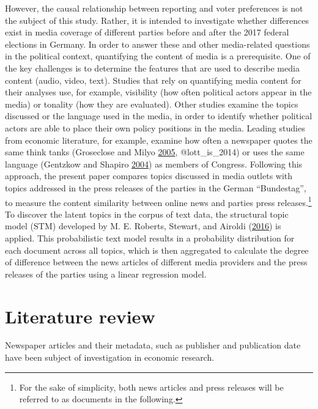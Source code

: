 \documentclass[
]{article}
\begin{document}
However, the causal relationship between reporting and voter preferences
is not the subject of this study. Rather, it is intended to investigate
whether differences exist in media coverage of different parties before
and after the 2017 federal elections in Germany. In order to answer
these and other media-related questions in the political context,
quantifying the content of media is a prerequisite. One of the key
challenges is to determine the features that are used to describe media
content (audio, video, text). Studies that rely on quantifying media
content for their analyses use, for example, visibility (how often
political actors appear in the media) or tonality (how they are
evaluated). Other studies examine the topics discussed or the language
used in the media, in order to identify whether political actors are
able to place their own policy positions in the media. Leading studies
from economic literature, for example, examine how often a newspaper
quotes the same think tanks (Groseclose and Milyo
\protect\hyperlink{ref-groseclose_measure_2005}{2005}, @lott\_is\_2014)
or uses the same language (Gentzkow and Shapiro
\protect\hyperlink{ref-gentzkow_media_2004}{2004}) as members of
Congress. Following this approach, the present paper compares topics
discussed in media outlets with topics addressed in the press releases
of the parties in the German ``Bundestag'', to measure the content
similarity between online news and parties press releases.\footnote{For
  the sake of simplicity, both news articles and press releases will be
  referred to as documents in the following.} To discover the latent
topics in the corpus of text data, the structural topic model (STM)
developed by M. E. Roberts, Stewart, and Airoldi
(\protect\hyperlink{ref-roberts_model_2016}{2016}) is applied. This
probabilistic text model results in a probability distribution for each
document across all topics, which is then aggregated to calculate the
degree of difference between the news articles of different media
providers and the press releases of the parties using a linear
regression model.

\hypertarget{literature-review}{%
\section{Literature review}\label{literature-review}}

Newspaper articles and their metadata, such as publisher and publication
date have been subject of investigation in economic research.
\end{document}
